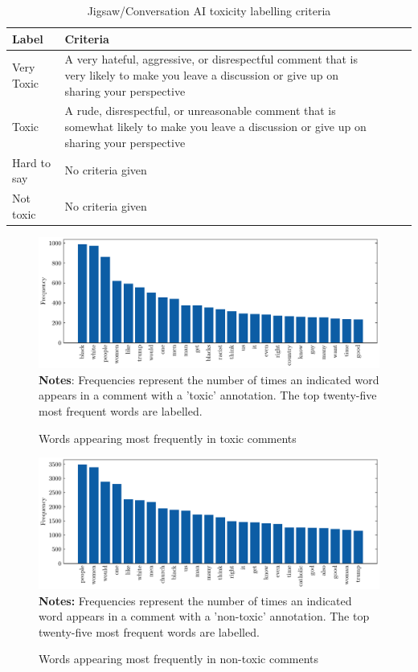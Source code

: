 \begin{table}[h]
	\caption{Jigsaw/Conversation AI toxicity labelling criteria \label{table:toxicity}}
    \centering
    \begin{tabular}{lllll}
        \toprule
        Label & Criteria \\
        \midrule
        Very Toxic & \parbox{11cm}{A very hateful, aggressive, or disrespectful comment that is very likely to make you leave a discussion or give up on sharing your perspective}\\
		\addlinespace{}
        Toxic & \parbox{10cm}{A rude, disrespectful, or unreasonable comment that is somewhat likely to make you leave a discussion or give up on sharing your perspective} & \\
		\addlinespace{}
        Hard to say & \parbox{10cm}{No criteria given} & \\
		\addlinespace{}
        Not toxic & \parbox{10cm}{No criteria given} & \\
        \bottomrule
    \end{tabular}
\end{table}

\begin{figure}
    \caption{Words appearing most frequently in toxic comments}
	\label{fig:toxic-word-frequency}
	\includegraphics[width=1.0\textwidth]{graphics/toxic_word_freq.pdf}
    \textbf{Notes}: Frequencies represent the number of times an indicated word appears in a comment with a 'toxic' annotation. The top twenty-five most frequent words are labelled.
\end{figure}


\begin{figure}
    \caption{Words appearing most frequently in non-toxic comments}
	\label{fig:non-toxic-word-frequency}
	\includegraphics[width=1.0\textwidth]{graphics/nontoxic_word_freq.pdf}
    \textbf{Notes:} Frequencies represent the number of times an indicated word appears in a comment with a 'non-toxic' annotation. The top twenty-five most frequent words are labelled.
\end{figure}